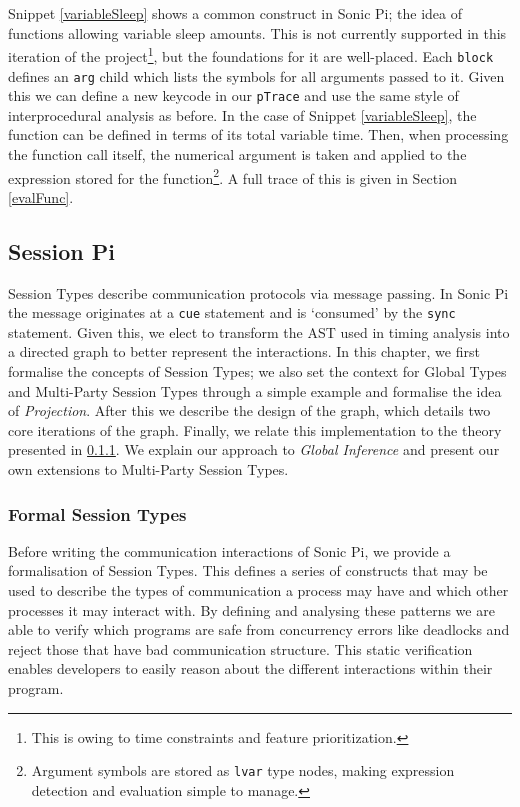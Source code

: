 \documentclass[11pt, abstracton, twoside, titlepage=true]{scrartcl}
\begin{document}
Snippet \ref{variableSleep} shows a common construct in Sonic Pi; the idea of 
functions allowing variable sleep amounts. This is not currently supported in this 
iteration of the project\footnote{This is owing to time constraints and feature prioritization.}, but the foundations for it are well-placed. Each 
\texttt{block} defines an \texttt{arg} child which lists the symbols for all 
arguments passed to it. Given this we can define a new keycode in our \texttt{pTrace}
and use the same style of interprocedural analysis as before. In the case of Snippet 
\ref{variableSleep}, the function can be defined in terms of its total variable time.
Then, when processing the function call itself, the numerical argument is taken and 
applied to the expression stored for the function\footnote{Argument symbols are 
stored as \texttt{lvar} type nodes, making expression detection and evaluation 
simple to manage.}. A full trace of this is given in Section \ref{evalFunc}.

\subsection{Session Pi} \label{sessionPi}
Session Types describe communication protocols via message passing. In Sonic Pi
the message originates at a \texttt{cue} statement and is `consumed' by the
\texttt{sync} statement. Given this, we elect to transform the AST used in
timing analysis into a directed graph to better represent the interactions. In this 
chapter, we first formalise the concepts of Session Types; we also set the 
context for Global Types and Multi-Party Session Types through a simple example and 
formalise the idea of \emph{Projection}. After this we describe the design of the 
graph, which details two core iterations of the graph. Finally, we relate 
this implementation to the theory presented in \ref{formalST}. We explain our 
approach to \emph{Global Inference} and present our own extensions to Multi-Party 
Session Types.

\subsubsection{Formal Session Types} \label{formalST}
Before writing the communication interactions of Sonic Pi, we provide a formalisation 
of Session Types. This defines a series of constructs that may be used to describe 
the types of communication a process may have and which other processes it may 
interact with. By defining and analysing these patterns we are able to verify which 
programs are safe from concurrency errors like deadlocks and reject those that have 
bad communication structure. This static verification enables developers to easily 
reason about the different interactions within their program.
\end{document}
